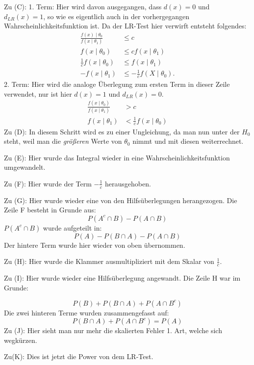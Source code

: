 \documentclass[10pt]{article}
\newcommand{\dlr}{d_{LR}}%
\newenvironment{BWS}[1][]
{\begin{Beweis}[frametitle=#1]}{\end{Beweis}}
\begin{document}
\begin{BWS}[Beweis (NP-Lemma)]
			Zu (C): 1. Term: Hier wird davon ausgegangen, dass $d(x) =0$ und $\dlr(x) = 1$, so wie es eigentlich auch in der vorhergegangen Wahrscheinlichkeitsfunktion ist. Da der LR-Test hier verwirft entsteht folgendes:
			\begin{equation*}
				\begin{split}
					\frac{f(x) \mid \theta_0}{f(x\mid \theta_1)} &\leq c \\
					f(x\mid \theta_0) &\leq c f(x\mid \theta_1)\\
					\frac{1}{c} f(x\mid \theta_0) &\leq f(x\mid \theta_1)\\
					-f(x\mid \theta_1) &\leq -\frac{1}{c} f(X\mid \theta_0).
				\end{split}
			\end{equation*}
			2. Term: Hier wird die analoge Überlegung zum ersten Term in dieser Zeile verwendet, nur ist hier $d(x) = 1$ und $\dlr(x)=0$. 
			\begin{equation*}
				\begin{split}
					\frac{f(x \mid \theta_0)}{f(x\mid \theta_1)} &> c \\
					f(x\mid \theta_1) &< \frac{1}{c} f(x \mid \theta_0)
				\end{split}
			\end{equation*}
			Zu (D): In diesem Schritt wird es zu einer Ungleichung, da man nun unter der $H_0$ steht, weil man die \textit{größeren} Werte von $\theta_0$ nimmt und mit diesen weiterrechnet.
			
			Zu (E): Hier wurde das Integral wieder in eine Wahrscheinlichkeitsfunktion umgewandelt.
			
			Zu (F): Hier wurde der Term $-\frac{1}{c}$ herausgehoben.
			
			Zu (G): Hier wurde wieder eine von den Hilfsüberlegungen herangezogen. Die Zeile F besteht in Grunde aus: 
			\begin{equation*}
				P(A^c \cap B) - P(A \cap B)
			\end{equation*}
			$P(A^c \cap B)$ wurde aufgeteilt in:
			\begin{equation*}
				P(A) - P(B \cap A) - P(A \cap B)
			\end{equation*}
			Der hintere Term wurde hier wieder von oben übernommen.
			
			Zu (H): Hier wurde die Klammer ausmultipliziert mit dem Skalar von $\frac{1}{c}$. 
			
			Zu (I): Hier wurde wieder eine Hilfsüberlegung angewandt. Die Zeile H war im Grunde:
			
			\begin{equation*}
				P(B) + P(B \cap A) + P(A \cap B^c)
			\end{equation*}
			Die zwei hinteren Terme wurden zusammengefasst auf:
			\begin{equation*}
				P(B \cap A) + P(A \cap B^c) = P(A)
			\end{equation*}
			Zu (J): Hier sieht man nur mehr die skalierten Fehler 1. Art, welche sich wegkürzen.
			
			Zu(K): Dies ist jetzt die Power von dem LR-Test. 
		\end{BWS}
	
\end{document}
